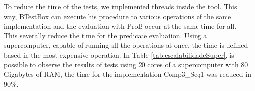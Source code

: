 \documentclass[runningheads]{llncs}
\begin{document}
To reduce the time of the tests, we implemented threads inside the tool. This way, BTestBox can execute his procedure to various operations of the same implementation and the evaluation with ProB occur at the same time for all. This severally reduce the time for the predicate evaluation. Using a supercomputer, capable of running all the operations at once, the time is defined based in the most expensive operation. In Table \ref{tab:escalabilidadeSuper}, is possible to observe the results of tests using 20 cores of a supercomputer with 80 Gigabytes of RAM, the time for the implementation Comp3\_Seq1 was reduced in 90\%.

\begin{table}[h]
\centering
\caption{Scalability test with the supercomputer}
\label{tab:escalabilidadeSuper}
\end{table}
\end{document}
